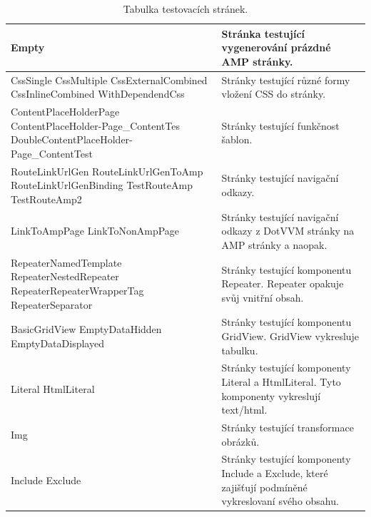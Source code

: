 \begin{table}[H]
	\caption{Tabulka testovacích stránek.} 
	\centering
	\begin{tabular}{m{15em}|m{15em}}
		\toprule
		Empty & Stránka testující vygenerování prázdné AMP stránky. \\ \midrule
		CssSingle\newline
		CssMultiple\newline 
		CssExternalCombined\newline 
		CssInlineCombined\newline 
		WithDependendCss &  Stránky testující různé formy vložení CSS do stránky. \\ \midrule
		ContentPlaceHolderPage\newline
        ContentPlaceHolder-\newline Page_ContentTes\newline
        DoubleContentPlaceHolder-\newline Page_ContentTest\newline & Stránky testující funkčnost šablon. \\ \midrule
		RouteLinkUrlGen\newline
        RouteLinkUrlGenToAmp\newline
        RouteLinkUrlGenBinding\newline
        TestRouteAmp\newline
        TestRouteAmp2& Stránky testující navigační odkazy. \\\midrule
        LinkToAmpPage\newline
        LinkToNonAmpPage & Stránky testující navigační odkazy z DotVVM stránky na AMP stránky a naopak. \\\midrule
        RepeaterNamedTemplate\newline
        RepeaterNestedRepeater\newline
        RepeaterRepeaterWrapperTag\newline
        RepeaterSeparator & Stránky testující komponentu Repeater. Repeater opakuje svůj vnitřní obsah. \\\midrule
        BasicGridView\newline
        EmptyDataHidden\newline
        EmptyDataDisplayed\newline & Stránky testující komponentu GridView. GridView vykresluje tabulku. \\\midrule
        Literal\newline
        HtmlLiteral & Stránky testující komponenty Literal a HtmlLiteral. Tyto komponenty vykreslují text/html. \\\midrule
        Img & Stránky testující transformace obrázků.  \\\midrule
        Include\newline
        Exclude & Stránky testující komponenty Include a Exclude, které zajišťují podmíněné vykreslovaní svého obsahu.\\
		\bottomrule
	\end{tabular}
	\label{tab: Tabulka testovacich stranek}
\end{table}

